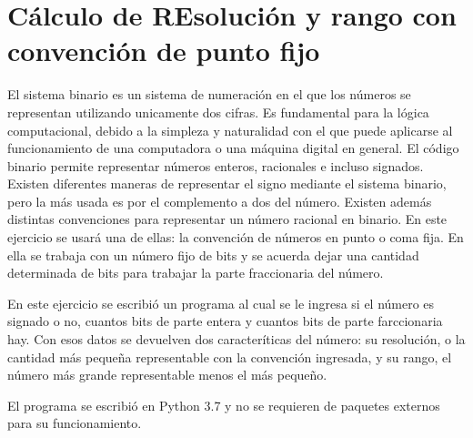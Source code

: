 \section{Cálculo de REsolución y rango con convención de punto fijo}
El sistema binario es un sistema de numeración en el que los números se representan utilizando unicamente dos cifras. Es fundamental para la lógica computacional, debido a la simpleza y naturalidad con el que puede aplicarse al funcionamiento de una computadora o una máquina digital en general. El código binario permite representar números enteros, racionales e incluso signados. Existen diferentes maneras de representar el signo mediante el sistema binario, pero la más usada es por el complemento a dos del número. Existen además distintas convenciones para representar un número racional en binario. En este ejercicio se usará una de ellas: la convención de números en punto o coma fija. En ella se trabaja con un número fijo de bits y se acuerda dejar una cantidad determinada de bits para trabajar la parte fraccionaria del número. 

En este ejercicio se escribió un programa al cual se le ingresa si el número es signado o no, cuantos bits de parte entera y cuantos bits de parte farccionaria hay. Con esos datos se devuelven dos caracteríticas del número: su resolución, o la cantidad más pequeña representable con la convención ingresada, y su rango, el número más grande representable menos el más pequeño. 

El programa se escribió en Python 3.7 y no se requieren de paquetes externos para su funcionamiento.